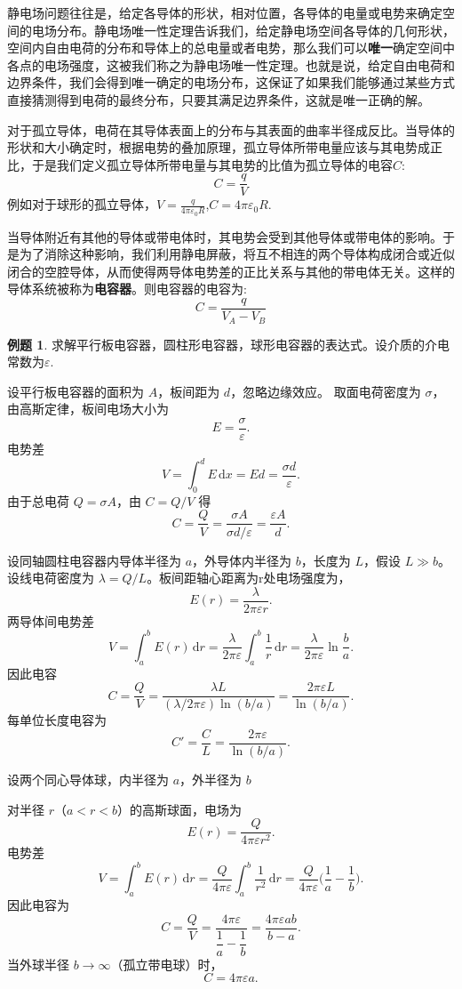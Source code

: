 \documentclass[12pt,a4paper,oneside]{report}
\theoremstyle{definition}
\newtheorem{example}{例题}[chapter]
\theoremstyle{remark}
\begin{document}
静电场问题往往是，给定各导体的形状，相对位置，各导体的电量或电势来确定空间的电场分布。静电场唯一性定理告诉我们，给定静电场空间各导体的几何形状，空间内自由电荷的分布和导体上的总电量或者电势，那么我们可以\textbf{唯一}确定空间中各点的电场强度，这被我们称之为静电场唯一性定理。也就是说，给定自由电荷和边界条件，我们会得到唯一确定的电场分布，这保证了如果我们能够通过某些方式直接猜测得到电荷的最终分布，只要其满足边界条件，这就是唯一正确的解。

对于孤立导体，电荷在其导体表面上的分布与其表面的曲率半径成反比。当导体的形状和大小确定时，根据电势的叠加原理，孤立导体所带电量应该与其电势成正比，于是我们定义孤立导体所带电量与其电势的比值为孤立导体的电容$C$:
\[
C=\frac{q}{V}
\]
例如对于球形的孤立导体，$V=\frac{q}{4\pi\varepsilon_0R}$,$C=4\pi\varepsilon_0R$.

当导体附近有其他的导体或带电体时，其电势会受到其他导体或带电体的影响。于是为了消除这种影响，我们利用静电屏蔽，将互不相连的两个导体构成闭合或近似闭合的空腔导体，从而使得两导体电势差的正比关系与其他的带电体无关。这样的导体系统被称为\textbf{电容器}。则电容器的电容为:
\[
C=\frac{q}{V_A-V_B}
\]

\begin{example}
求解平行板电容器，圆柱形电容器，球形电容器的表达式。设介质的介电常数为$\varepsilon$.

设平行板电容器的面积为 $A$，板间距为 $d$，忽略边缘效应。
  取面电荷密度为 $\sigma$，由高斯定律，板间电场大小为
  \[
    E=\frac{\sigma}{\varepsilon}.
  \]
  电势差
  \[
    V=\int_0^d E\,\mathrm{d}x=E d=\frac{\sigma d}{\varepsilon}.
  \]
  由于总电荷 $Q=\sigma A$，由 $C=Q/V$ 得
  \[
    C=\frac{Q}{V}=\frac{\sigma A}{\sigma d/\varepsilon}=\frac{\varepsilon A}{d}.
  \]

  设同轴圆柱电容器内导体半径为 $a$，外导体内半径为 $b$，长度为 $L$，假设 $L\gg b$。设线电荷密度为 $\lambda=Q/L$。板间距轴心距离为r处电场强度为，
  \[
    E(r)=\frac{\lambda}{2\pi\varepsilon r}.
  \]
  两导体间电势差
  \[
    V=\int_a^b E(r)\,\mathrm{d}r=\frac{\lambda}{2\pi\varepsilon}\int_a^b\frac{1}{r}\,\mathrm{d}r
    =\frac{\lambda}{2\pi\varepsilon}\ln\frac{b}{a}.
  \]
  因此电容
  \[
    C=\frac{Q}{V}=\frac{\lambda L}{(\lambda/2\pi\varepsilon)\ln(b/a)}=\frac{2\pi\varepsilon L}{\ln(b/a)}.
  \]
  每单位长度电容为
  \[
    C'=\frac{C}{L}=\frac{2\pi\varepsilon}{\ln(b/a)}.
  \]

  设两个同心导体球，内半径为 $a$，外半径为 $b$
  
  对半径 $r$（$a<r<b$）的高斯球面，电场为
  \[
    E(r)=\frac{Q}{4\pi\varepsilon r^2}.
  \]
  电势差
  \[
    V=\int_a^b E(r)\,\mathrm{d}r=\frac{Q}{4\pi\varepsilon}\int_a^b\frac{1}{r^2}\,\mathrm{d}r
    =\frac{Q}{4\pi\varepsilon}\Big(\frac{1}{a}-\frac{1}{b}\Big).
  \]
  因此电容为
  \[
    C=\frac{Q}{V}=\frac{4\pi\varepsilon}{\dfrac{1}{a}-\dfrac{1}{b}}=\frac{4\pi\varepsilon ab}{\,b-a\,}.
  \]
  当外球半径 $b\to\infty$（孤立带电球）时，
  \[
    C=4\pi\varepsilon a.
  \]
\end{example}
\end{document}
